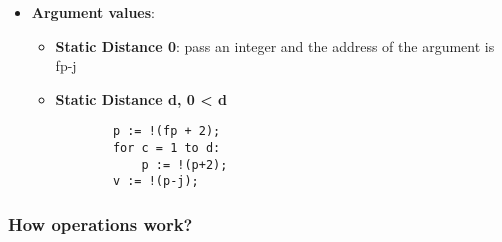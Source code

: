 \documentclass{article}
\begin{document}
\begin{itemize}
	\item \textbf{Argument values}: 
	
	\begin{itemize}
		\item \textbf{Static Distance 0}: pass an integer and the address of the argument is fp-j
		\item \textbf{Static Distance d, 0 < d}
		\begin{lstlisting}
		p := !(fp + 2);
		for c = 1 to d:
			p := !(p+2);
		v := !(p-j);
		\end{lstlisting}
	\end{itemize}
\end{itemize}

\subsubsection{How operations work?}
\end{document}
